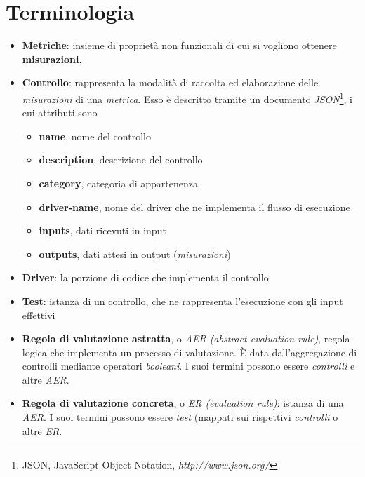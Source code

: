 \documentclass[../main.tex]{subfiles}
\begin{document}
\section{Terminologia}
\label{sec:terminology}
\begin{itemize}
    \item \textbf{Metriche}: insieme di proprietà non funzionali di cui si vogliono ottenere \textbf{misurazioni}.
    \item \textbf{Controllo}: rappresenta la modalità di raccolta ed elaborazione delle \textit{misurazioni} di una \textit{metrica}.
        Esso è descritto tramite un documento \textit{JSON}\footnote{JSON, JavaScript Object Notation, \textit{http://www.json.org/}}, i cui attributi sono
        \begin{itemize}
            \item \textbf{name}, nome del controllo
            \item \textbf{description}, descrizione del controllo
            \item \textbf{category}, categoria di appartenenza
            \item \textbf{driver-name}, nome del driver che ne implementa il flusso di esecuzione
            \item \textbf{inputs}, dati ricevuti in input
            \item \textbf{outputs}, dati attesi in output (\textit{misurazioni})
        \end{itemize}
    \item \textbf{Driver}: la porzione di codice che implementa il controllo 
    \item \textbf{Test}: istanza di un controllo, che ne rappresenta l'esecuzione con gli input effettivi 
    \item \textbf{Regola di valutazione astratta}, o \textit{AER (abstract evaluation rule)}, regola logica che implementa un processo di valutazione. È data dall'aggregazione di controlli mediante operatori \textit{booleani}. I suoi termini possono essere \textit{controlli} e altre \textit{AER}.
    \item \textbf{Regola di valutazione concreta}, o \textit{ER (evaluation rule)}: istanza di una \textit{AER}. I suoi termini possono essere \textit{test} (mappati sui rispettivi \textit{controlli} o altre \textit{ER}.
\end{itemize}
\vfill
\newpage
\end{document}
